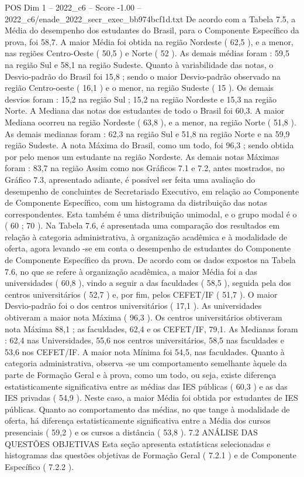 \begin{textsample}{POS Dim 1 – 2022\_c6 – Score -1.00 – 2022\_c6/enade\_2022\_secr\_exec\_bb974bcf1d.txt}
De acordo com a Tabela 7.5, a Média do desempenho dos estudantes do Brasil, para o Componente Específico da prova, foi 58,7.
A maior Média foi obtida na região Nordeste ( 62,5 ), e a menor, nas regiões Centro-Oeste ( 50,5 ) e Norte ( 52 ).
As demais médias foram : 59,5 na região Sul e 58,1 na região Sudeste.
Quanto à variabilidade das notas, o Desvio-padrão do Brasil foi 15,8 ; sendo o maior Desvio-padrão observado na região Centro-oeste ( 16,1 ) e o menor, na região Sudeste ( 15 ).
Os demais desvios foram : 15,2 na região Sul ; 15,2 na região Nordeste e 15,3 na região Norte.
A Mediana das notas dos estudantes de todo o Brasil foi 60,3.
A maior Mediana ocorreu na região Nordeste ( 63,8 ), e a menor, na região Norte ( 51,8 ).
As demais medianas foram : 62,3 na região Sul e 51,8 na região Norte e na 59,9 região Sudeste.
A nota Máxima do Brasil, como um todo, foi 96,3 ; sendo obtida por pelo menos um estudante na região Nordeste.
As demais notas Máximas foram : 83,7 na região Assim como nos Gráficos 7.1 e 7.2, antes mostrados, no Gráfico 7.3, apresentado adiante, é possível ser feita uma avaliação do desempenho de concluintes de Secretariado Executivo, em relação ao Componente de Componente Específico, com um histograma da distribuição das notas correspondentes.
Esta também é uma distribuição unimodal, e o grupo modal é o ( 60 ; 70 ).
Na Tabela 7.6, é apresentada uma comparação dos resultados em relação à categoria administrativa, à organização acadêmica e à modalidade de oferta, agora levando -se em conta o desempenho de estudantes do Componente de Componente Específico da prova.
De acordo com os dados expostos na Tabela 7.6, no que se refere à organização acadêmica, a maior Média foi a das universidades ( 60,8 ), vindo a seguir a das faculdades ( 58,5 ), seguida pela dos centros universitários ( 52,7 ) e, por fim, pelos CEFET/IF ( 51,7 ).
O maior Desvio-padrão foi o dos centros universitários ( 17,1 ).
As universidades obtiveram a maior nota Máxima ( 96,3 ).
Os centros universitários obtiveram nota Máxima 88,1 ; as faculdades, 62,4 e os CEFET/IF, 79,1.
As Medianas foram : 62,4 nas Universidades, 55,6 nos centros universitários, 58,5 nas faculdades e 53,6 nos CEFET/IF.
A maior nota Mínima foi 54,5, nas faculdades.
Quanto à categoria administrativa, observa -se um comportamento semelhante àquele da parte de Formação Geral e à prova, como um todo, ou seja, existe diferença estatisticamente significativa entre as médias das IES públicas ( 60,3 ) e as das IES privadas ( 54,9 ).
Neste caso, a maior Média foi obtida por estudantes de IES públicas.
Quanto ao comportamento das médias, no que tange à modalidade de oferta, há diferença estatisticamente significativa entre a Média dos cursos presenciais ( 59,2 ) e os cursos a distância ( 53,8 ). 7.2 ANÁLISE DAS QUESTÕES OBJETIVAS Esta seção apresenta estatísticas selecionadas e histogramas das questões objetivas de Formação Geral ( 7.2.1 ) e de Componente Específico ( 7.2.2 ).

\end{textsample}
